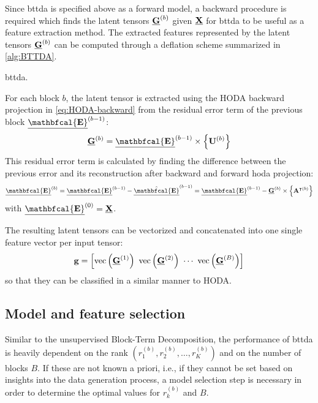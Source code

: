 Since \ac{bttda} is specified above as a forward model, a backward procedure
is required which finds the latent tensors $\underline{\mathbf{G}}^{(b)}$ given $\underline{\mathbf{X}}$ for
\ac{bttda} to be useful as a feature extraction method.
The extracted features represented by the latent tensors $\underline{\mathbf{G}}^{(b)}$ can be
computed through a deflation scheme summarized in \cref{alg:BTTDA}.
\begin{algorithm}
  \caption[A \acs{bttda} feature extraction.]{\Ac{bttda}.}
	\label{alg:BTTDA}
	
\end{algorithm}
For each block $b$, the latent tensor is extracted using the HODA backward
projection in \cref{eq:HODA-backward} from the residual error term of the previous
block $\ten{\mathbfcal{E}}^{(b-1)}$:
\begin{equation}
	\ten{G}^{(b)} = \ten{\mathbfcal{E}}^{(b-1)}\mmpr{\mat{U}^{(b)}}
\end{equation}
This residual error term is calculated by finding the difference between the
previous error and its reconstruction after backward and forward \ac{hoda}
projection:
\begin{equation}
  \ten{\mathbfcal{E}}^{(b)}
  = \ten{\mathbfcal{E}}^{(b-1)} - \hat{\ten{\mathbfcal{E}}}^{(b-1)}
  = \ten{\mathbfcal{E}}^{(b-1)} - \ten{G}^{(b)}\mmpr{\mat{A}^{\intercal(b)}}
\end{equation}
with $\ten{\mathbfcal{E}}^{(0)}=\ten{X}$.

The resulting latent tensors can be vectorized and concatenated into
one single feature vector per input tensor:
\begin{equation}
	\mathbf{g}
	=\left[\operatorname{vec}\left(\underline{\mathbf{G}}^{(1)}\right)\
		\operatorname{vec}\left(\underline{\mathbf{G}}^{(2)}\right)\
		\cdots\
		\operatorname{vec}\left(\underline{\mathbf{G}}^{(B)}\right)\right]
\end{equation}
so that they can be classified in a similar manner to HODA.


\subsection{Model and feature selection}
Similar to the unsupervised Block-Term Decomposition, the performance of
\ac{bttda} is
heavily dependent on the rank $(r_1^{(b)}, r_2^{(b)}, \ldots,
	r_K^{(b)})$ and on the number of blocks $B$.
If these are not known a priori, i.e., if they cannot be set based on insights into the
data generation process, a model selection step is necessary in order to
determine the optimal values for $r_k^{(b)}$ and $B$.

